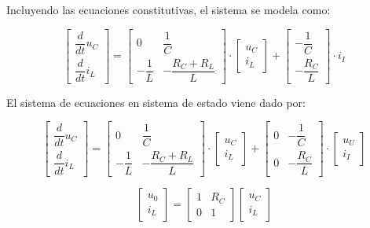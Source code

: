 Incluyendo las ecuaciones constitutivas, el sistema se modela como:

\vspace{-0.5cm}
\begin{equation}
    \begin{bmatrix}
        \dfrac{d}{dt}u_C\\
        \dfrac{d}{dt}i_L
    \end{bmatrix}
    =
    \begin{bmatrix}
        0 & \dfrac{1}{C}\\
        -\dfrac{1}{L} & -\dfrac{R_C + R_L}{L}
    \end{bmatrix}
    \cdot
    \begin{bmatrix}
        u_C\\
        i_L
    \end{bmatrix}
    +
    \begin{bmatrix}
        -\dfrac{1}{C}\\
        -\dfrac{R_C}{L}
    \end{bmatrix}
    \cdot
   i_I 
\end{equation}

El sistema de ecuaciones en sistema de estado viene dado por:

\vspace{-0.5cm}
\begin{equation}
    \begin{bmatrix}
        \dfrac{d}{dt}u_C\\
        \dfrac{d}{dt}i_L
    \end{bmatrix}
    =
    \begin{bmatrix}
        0 & \dfrac{1}{C}\\
        -\dfrac{1}{L} & -\dfrac{R_C + R_L}{L}
    \end{bmatrix}
    \cdot
    \begin{bmatrix}
        u_C\\
        i_L
    \end{bmatrix}
    +
    \begin{bmatrix}
        0 & -\dfrac{1}{C}\\
        0 & -\dfrac{R_C}{L}
    \end{bmatrix}
    \cdot
    \begin{bmatrix}
        u_U\\
        i_I
    \end{bmatrix} 
\end{equation}

\vspace{-0.5cm}
\begin{equation}
    \begin{bmatrix}
        u_0\\
        i_L
    \end{bmatrix}
    =
    \begin{bmatrix}
        1 & R_C\\
        0 & 1
    \end{bmatrix}
    \begin{bmatrix}
        u_C\\
        i_L
    \end{bmatrix}
\end{equation}

